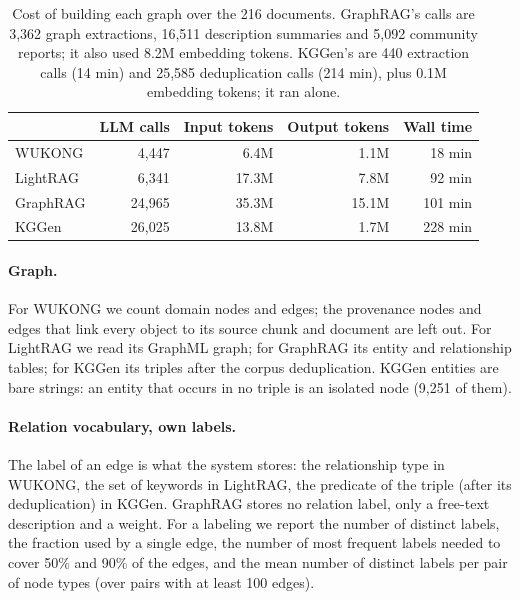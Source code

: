 \documentclass[11pt]{article}
\newcommand{\wk}{WUKONG}
\begin{document}
\begin{table}[h]
\centering
\begin{tabular}{lrrrr}
\toprule
 & LLM calls & Input tokens & Output tokens & Wall time \\
\midrule
\wk{} & 4,447 & 6.4M & 1.1M & 18 min \\
LightRAG & 6,341 & 17.3M & 7.8M & 92 min \\
GraphRAG & 24,965 & 35.3M & 15.1M & 101 min \\
KGGen & 26,025 & 13.8M & 1.7M & 228 min \\
\bottomrule
\end{tabular}
\caption{Cost of building each graph over the 216 documents. GraphRAG's calls are
3,362 graph extractions, 16,511 description summaries and 5,092 community reports; it also used
8.2M embedding tokens. KGGen's are 440 extraction calls (14 min) and 25,585 deduplication calls
(214 min), plus 0.1M embedding tokens; it ran alone.}
\label{tab:cost}
\end{table}

\paragraph{Graph.} For \wk{} we count domain nodes and edges; the provenance nodes and edges that
link every object to its source chunk and document are left out. For LightRAG we read its
GraphML graph; for GraphRAG its entity and relationship tables; for KGGen its triples after the
corpus deduplication. KGGen entities are bare strings: an entity that occurs in no triple is an
isolated node (9,251 of them).

\paragraph{Relation vocabulary, own labels.} The label of an edge is what the system stores:
the relationship type in \wk, the set of keywords in LightRAG, the predicate of the triple (after
its deduplication) in KGGen. GraphRAG stores no relation
label, only a free-text description and a weight. For a labeling we report the number of
distinct labels, the fraction used by a single edge, the number of most frequent labels needed
to cover 50\% and 90\% of the edges, and the mean number of distinct labels per pair of node
types (over pairs with at least 100 edges).
\end{document}
